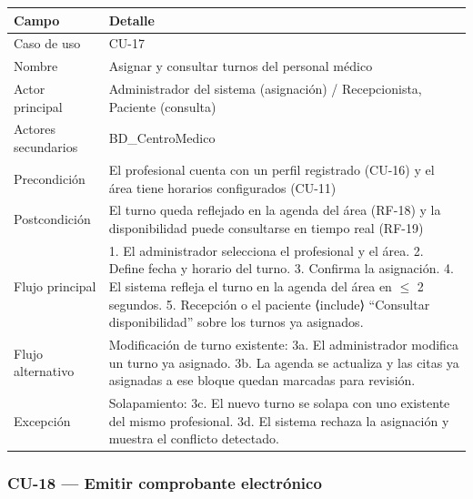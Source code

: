 \documentclass[11pt,a4paper]{article}
\begin{document}
	\begin{longtable}{p{} p{} }
		
		
		\toprule
		\textbf{Campo} &
		\textbf{Detalle}  \\
		\midrule
		\endhead
		
		Caso de uso & CU-17 \\
		Nombre & Asignar y consultar turnos del personal médico \\
		Actor principal & Administrador del sistema (asignación) / Recepcionista, Paciente (consulta) \\
		Actores secundarios & BD\_CentroMedico \\
		Precondición & El profesional cuenta con un perfil registrado (CU-16) y el área tiene horarios configurados (CU-11) \\
		Postcondición & El turno queda reflejado en la agenda del área (RF-18) y la disponibilidad puede consultarse en tiempo real (RF-19) \\
		Flujo principal & 1. El administrador selecciona el profesional y el área. 2. Define fecha y horario del turno. 3. Confirma la asignación. 4. El sistema refleja el turno en la agenda del área en \(\leq\) 2 segundos. 5. Recepción o el paciente ⟨include⟩ ``Consultar disponibilidad'' sobre los turnos ya asignados. \\
		Flujo alternativo & Modificación de turno existente: 3a. El administrador modifica un turno ya asignado. 3b. La agenda se actualiza y las citas ya asignadas a ese bloque quedan marcadas para revisión. \\
		Excepción & Solapamiento: 3c. El nuevo turno se solapa con uno existente del mismo profesional. 3d. El sistema rechaza la asignación y muestra el conflicto detectado. \\
		\bottomrule
	\end{longtable}
	
	\subsubsection{CU-18 --- Emitir comprobante electrónico}
	
\end{document}
